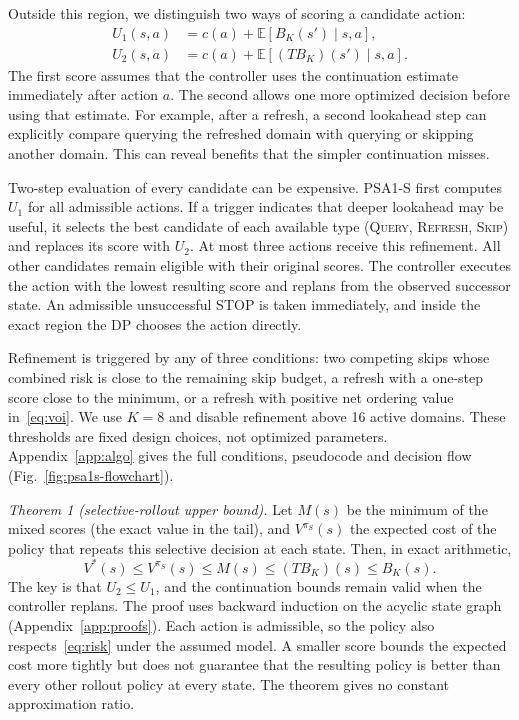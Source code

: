 \documentclass[conference]{IEEEtran}
\newcommand{\QUERY}{\textsc{Query}}
\newcommand{\REFRESH}{\textsc{Refresh}}
\newcommand{\SKIP}{\textsc{Skip}}
\begin{document}
Outside this region, we distinguish two ways of scoring a candidate action:
\begin{align}
 U_1(s,a)&=c(a)+\mathbb E[B_K(s')\mid s,a],\\
 U_2(s,a)&=c(a)+\mathbb E[(TB_K)(s')\mid s,a].
 \label{eq:scores}
\end{align}
The first score assumes that the controller uses the continuation estimate immediately after action $a$. The second allows one more optimized decision before using that estimate. For example, after a refresh, a second lookahead step can explicitly compare querying the refreshed domain with querying or skipping another domain. This can reveal benefits that the simpler continuation misses.

Two-step evaluation of every candidate can be expensive. PSA1-S first computes $U_1$ for all admissible actions. If a trigger indicates that deeper lookahead may be useful, it selects the best candidate of each available type (\QUERY{}, \REFRESH{}, \SKIP{}) and replaces its score with $U_2$. At most three actions receive this refinement. All other candidates remain eligible with their original scores. The controller executes the action with the lowest resulting score and replans from the observed successor state. An admissible unsuccessful STOP is taken immediately, and inside the exact region the DP chooses the action directly.

Refinement is triggered by any of three conditions: two competing skips whose combined risk is close to the remaining skip budget, a refresh with a one-step score close to the minimum, or a refresh with positive net ordering value in~\eqref{eq:voi}. We use $K=8$ and disable refinement above 16 active domains. These thresholds are fixed design choices, not optimized parameters. Appendix~\ref{app:algo} gives the full conditions, pseudocode and decision flow (Fig.~\ref{fig:psa1s-flowchart}).

\textit{Theorem 1 (selective-rollout upper bound).} Let $M(s)$ be the minimum of the mixed scores (the exact value in the tail), and $V^{\pi_S}(s)$ the expected cost of the policy that repeats this selective decision at each state. Then, in exact arithmetic,
\begin{equation}
 V^*(s)\le V^{\pi_S}(s)\le M(s)\le (TB_K)(s)\le B_K(s).
 \label{eq:guarantee}
\end{equation}
The key is that $U_2\le U_1$, and the continuation bounds remain valid when the controller replans. The proof uses backward induction on the acyclic state graph (Appendix~\ref{app:proofs}). Each action is admissible, so the policy also respects~\eqref{eq:risk} under the assumed model. A smaller score bounds the expected cost more tightly but does not guarantee that the resulting policy is better than every other rollout policy at every state. The theorem gives no constant approximation ratio.
\end{document}
